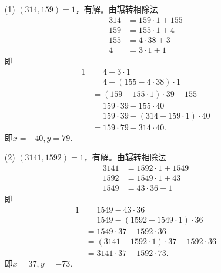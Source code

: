 \documentclass[UTF8]{ctexart}
\begin{document}
\subsection{}   %
\begin{enumerate}
    \item [(1)]$(314,159)=1$，有解。由辗转相除法
    \begin{align*}
        314 & = 159\cdot 1 + 155\\
        159 & = 155\cdot 1 + 4\\
        155 & = 4\cdot 38 + 3\\
        4 & = 3\cdot 1 + 1  
    \end{align*}
    即
    \begin{align*}
        1 
        & = 4 - 3\cdot 1\\
        & = 4 - (155-4\cdot 38)\cdot 1\\
        & = (159-155\cdot 1)\cdot 39 - 155\\
        & = 159\cdot 39 - 155\cdot 40\\
        & = 159\cdot 39 - (314-159\cdot 1)\cdot 40\\
        & = 159\cdot 79 - 314\cdot 40.
    \end{align*}
    即$x=-40,y=79$.
    \item [(2)]$(3141,1592)=1$，有解。由辗转相除法
    \begin{align*}
        3141 & = 1592\cdot 1 + 1549\\
        1592 & = 1549\cdot 1 + 43\\
        1549 & = 43\cdot 36 + 1
    \end{align*}
    即
    \begin{align*}
        1 
        & = 1549 - 43\cdot 36\\
        & = 1549 - (1592-1549\cdot 1)\cdot 36\\
        & = 1549\cdot 37 - 1592\cdot 36\\
        & = (3141-1592\cdot 1)\cdot 37 - 1592\cdot 36\\
        & = 3141\cdot 37 - 1592\cdot 73.
    \end{align*}
    即$x=37,y=-73$.
\end{enumerate}
\end{document}

